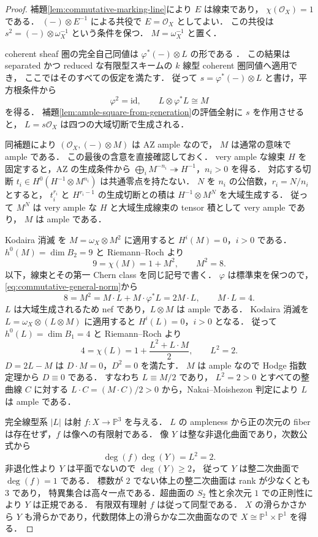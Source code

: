 \begin{proof}
補題\ref{lem:commutative-marking-line}により $E$ は線束であり，
$\chi(\mathcal O_X)=1$ である．
$(-)\otimes E^{-1}$ による共役で $E=\mathcal O_X$ としてよい．
この共役は $s^2=(-)\otimes\omega_X^{-1}$ という条件を保つ．
$M=\omega_X^{-1}$ と置く．

coherent sheaf 圏の完全自己同値は
$\varphi^*(-)\otimes L$ の形である
\cite[Tag~0FZR]{Stacks0FZR}．
この結果は separated かつ reduced な有限型スキームの $k$ 線型 coherent 圏同値へ適用でき，
ここではそのすべての仮定を満たす．
従って $s=\varphi^*(-)\otimes L$ と書け，平方根条件から
\[
 \varphi^2=\mathrm{id},\qquad L\otimes\varphi^*L\cong M
 \tag{N}\label{eq:commutative-general-norm}
\]
を得る．
補題\ref{lem:ample-square-from-generation}の評価全射に $s$ を作用させると，
$L=s\mathcal O_X$ は四つの大域切断で生成される．

同補題により $(\mathcal O_X,(-)\otimes M)$ は AZ ample なので，
$M$ は通常の意味で ample である．
この最後の含意を直接確認しておく．
very ample な線束 $H$ を固定すると，AZ の生成条件から
$\bigoplus_i M^{-n_i}\twoheadrightarrow H^{-1}$，$n_i>0$ を得る．
対応する切断 $t_i\in H^0(H^{-1}\otimes M^{n_i})$ は共通零点を持たない．
$N$ を $n_i$ の公倍数，$r_i=N/n_i$ とすると，
$t_i^{r_i}$ と $H^{r_i-1}$ の生成切断との積は
$H^{-1}\otimes M^N$ を大域生成する．
従って $M^N$ は very ample な $H$ と大域生成線束の tensor 積として very ample であり，
$M$ は ample である．

Kodaira 消滅 \cite[Theorem~1.2 and the subsequent characteristic-zero extension]{EsnaultViehweg1992}
を $M=\omega_X\otimes M^2$ に適用すると $H^i(M)=0$，$i>0$ である．
$h^0(M)=\dim B_2=9$ と Riemann--Roch より
\[
 9=\chi(M)=1+M^2,\qquad M^2=8.
\]
以下，線束とその第一 Chern class を同じ記号で書く．
$\varphi$ は標準束を保つので，\eqref{eq:commutative-general-norm}から
\[
 8=M^2=M\cdot L+M\cdot\varphi^*L=2M\cdot L,
 \qquad M\cdot L=4.
\]
$L$ は大域生成されるため nef であり，$L\otimes M$ は ample である．
Kodaira 消滅を $L=\omega_X\otimes(L\otimes M)$ に適用すると
$H^i(L)=0$，$i>0$ となる．
従って $h^0(L)=\dim B_1=4$ と Riemann--Roch より
\[
 4=\chi(L)=1+\frac{L^2+L\cdot M}{2},\qquad L^2=2.
\]
$D=2L-M$ は $D\cdot M=0$，$D^2=0$ を満たす．
$M$ は ample なので Hodge 指数定理から $D\equiv0$ である．
すなわち $L\equiv M/2$ であり，
$L^2=2>0$ とすべての整曲線 $C$ に対する
$L\cdot C=(M\cdot C)/2>0$ から，Nakai--Moishezon 判定により $L$ は ample である．

完全線型系 $|L|$ は射 $f\colon X\to\mathbb P^3$ を与える．
$L$ の ampleness から正の次元の fiber は存在せず，$f$ は像への有限射である．
像 $Y$ は整な非退化曲面であり，次数公式から
\[
 \deg(f)\deg(Y)=L^2=2.
\]
非退化性より $Y$ は平面でないので $\deg(Y)\ge2$，
従って $Y$ は整二次曲面で $\deg(f)=1$ である．
標数が $2$ でない体上の整二次曲面は rank が少なくとも $3$ であり，
特異集合は高々一点である．超曲面の $S_2$ 性と余次元 $1$ での正則性により $Y$ は正規である．
有限双有理射 $f$ は従って同型である．
$X$ の滑らかさから $Y$ も滑らかであり，代数閉体上の滑らかな二次曲面なので
$X\cong\mathbb P^1\times\mathbb P^1$ を得る．
\end{proof}

